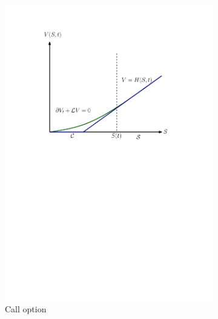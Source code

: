 \begin{figure}[H]
  \centering
  \begin{subfigure}{0.4\textwidth}
    \centering
    \includegraphics[width=\textwidth]{chapters/chapter2/AmericanCallOptionValue}
    \caption{Call option}
    \label{fig:blackscholes:preliminaries:american_call_value_vs_curve}
  \end{subfigure}
  \hfill
  \begin{subfigure}{0.4\textwidth}
    \centering

\end{subfigure}
\end{figure}
